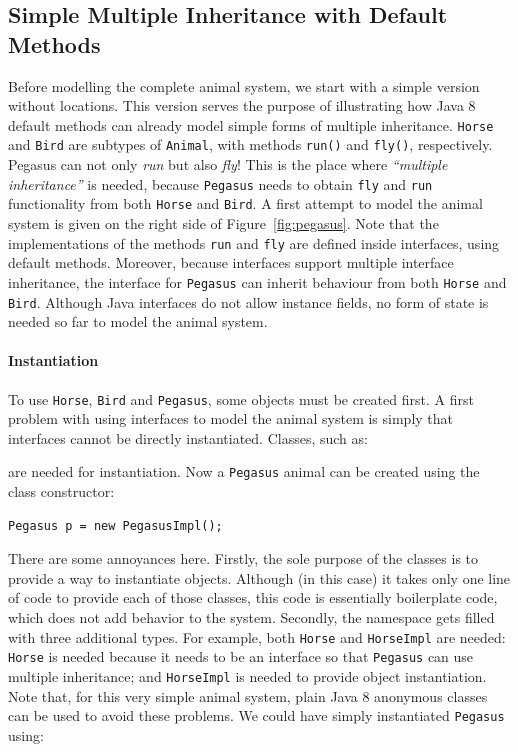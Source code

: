 \subsection{Simple Multiple Inheritance with Default
  Methods}\label{sec:simple}

Before modelling the complete animal system, we  start with a
simple version without locations. This version serves the purpose of illustrating how
Java 8 default methods can already model simple forms of multiple inheritance.
\texttt{Horse} and \texttt{Bird} are subtypes
of \texttt{Animal}, with methods \texttt{run()} and \texttt{fly()},
respectively. Pegasus can not only \emph{run} but also \emph{fly}! This is the
place where \emph{``multiple inheritance''} is needed, because
\texttt{Pegasus} needs to obtain \texttt{fly} and \texttt{run}
functionality from both \texttt{Horse} and \texttt{Bird}.
A first attempt to model the animal system is given on the right side
of Figure~\ref{fig:pegasus}.
Note that the implementations of the methods \texttt{run}
and \texttt{fly} are defined inside interfaces, using default
methods. Moreover, because interfaces support multiple interface
inheritance, the interface for \texttt{Pegasus} can inherit behaviour
from both \texttt{Horse} and \texttt{Bird}. Although Java interfaces
do not allow instance fields, no form of state is needed so far to
model the animal system.

\paragraph{Instantiation}
To use \texttt{Horse}, \texttt{Bird} and \texttt{Pegasus}, some
objects must be created first. A first problem with using
interfaces to model the animal system is simply that interfaces
cannot be directly instantiated. Classes, such as:


\noindent are needed for instantiation. Now a \texttt{Pegasus} animal can be created
using the class constructor:

\begin{lstlisting}
Pegasus p = new PegasusImpl();
\end{lstlisting}

\noindent There are some annoyances here. Firstly, the sole
purpose of the classes is to provide a way to instantiate
objects. Although (in this case) it takes only one line of code to
provide each of those classes, this code is essentially boilerplate
code, which does not add behavior to the system. Secondly,
the namespace gets filled with three additional types. For example,
both \texttt{Horse} and \texttt{HorseImpl} are needed: \texttt{Horse}
is needed because it needs to be an interface so that \texttt{Pegasus}
can use multiple inheritance; and \texttt{HorseImpl} is needed to
provide object instantiation.
Note that, for this very simple animal system, plain Java 8 anonymous
classes can be used to avoid these problems.  We could have simply
instantiated \texttt{Pegasus} using:

